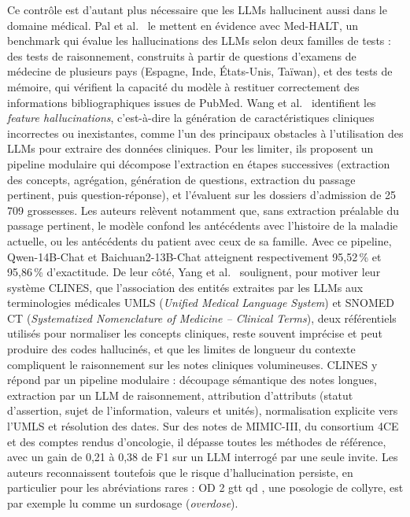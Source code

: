 Ce contrôle est d'autant plus nécessaire que les LLMs hallucinent aussi dans le domaine médical. Pal et al.~\cite{pal2023medhalt} le mettent en évidence avec Med-HALT, un benchmark qui évalue les hallucinations des LLMs selon deux familles de tests : des tests de raisonnement, construits à partir de questions d'examens de médecine de plusieurs pays (Espagne, Inde, États-Unis, Taïwan), et des tests de mémoire, qui vérifient la capacité du modèle à restituer correctement des informations bibliographiques issues de PubMed. Wang et al.~\cite{wang2024feature} identifient les \textit{feature hallucinations}, c'est-à-dire la génération de caractéristiques cliniques incorrectes ou inexistantes, comme l'un des principaux obstacles à l'utilisation des LLMs pour extraire des données cliniques. Pour les limiter, ils proposent un pipeline modulaire qui décompose l'extraction en étapes successives (extraction des concepts, agrégation, génération de questions, extraction du passage pertinent, puis question-réponse), et l'évaluent sur les dossiers d'admission de 25\,709 grossesses. Les auteurs relèvent notamment que, sans extraction préalable du passage pertinent, le modèle confond les antécédents avec l'histoire de la maladie actuelle, ou les antécédents du patient avec ceux de sa famille. Avec ce pipeline, Qwen-14B-Chat et Baichuan2-13B-Chat atteignent respectivement 95,52\,\% et 95,86\,\% d'exactitude. De leur côté, Yang et al.~\cite{yang2025clines} soulignent, pour motiver leur système CLINES, que l'association des entités extraites par les LLMs aux terminologies médicales UMLS (\textit{Unified Medical Language System}) et SNOMED CT (\textit{Systematized Nomenclature of Medicine -- Clinical Terms}), deux référentiels utilisés pour normaliser les concepts cliniques, reste souvent imprécise et peut produire des codes hallucinés, et que les limites de longueur du contexte compliquent le raisonnement sur les notes cliniques volumineuses. CLINES y répond par un pipeline modulaire : découpage sémantique des notes longues, extraction par un LLM de raisonnement, attribution d'attributs (statut d'assertion, sujet de l'information, valeurs et unités), normalisation explicite vers l'UMLS et résolution des dates. Sur des notes de MIMIC-III, du consortium 4CE et des comptes rendus d'oncologie, il dépasse toutes les méthodes de référence, avec un gain de 0,21 à 0,38 de F1 sur un LLM interrogé par une seule invite. Les auteurs reconnaissent toutefois que le risque d'hallucination persiste, en particulier pour les abréviations rares : \og OD 2 gtt qd \fg{}, une posologie de collyre, est par exemple lu comme un surdosage (\textit{overdose}).

